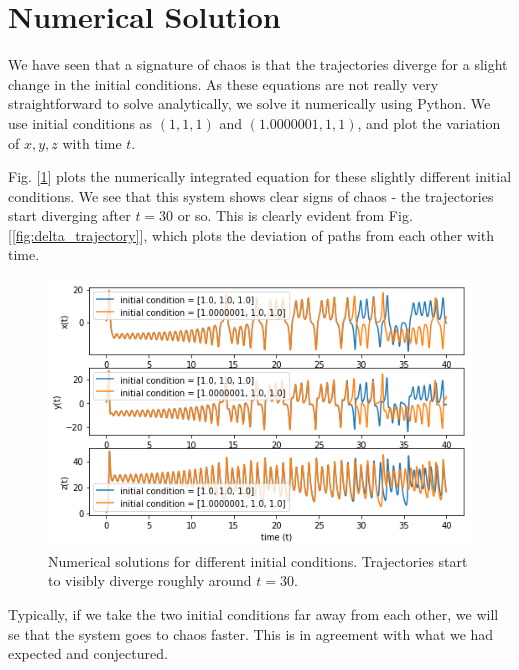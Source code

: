 \section{Numerical Solution}
We have seen that a signature of chaos is that the trajectories diverge for a slight change in the initial conditions. As these equations are not really very straightforward to solve analytically, we solve it numerically using Python. We use initial conditions as $(1,1,1)$ and $(1.0000001,1,1)$, and plot the variation of $x,y,z$ with time $t$. 

Fig. [\ref{fig:dyvar_vs_t}] plots the numerically integrated equation for these slightly different initial conditions. We see that this system shows clear signs of chaos - the trajectories start diverging after $t=30$ or so. This is clearly evident from Fig. [\ref{fig:delta_trajectory}], which plots the deviation of paths from each other with time.

\begin{figure}[h!]
	\centering
	\includegraphics[scale=0.8]{Figures/dyvar_vs_t.png}
	\caption[An Electron]{Numerical solutions for different initial conditions. Trajectories start to visibly diverge roughly around $t=30$.}
	\label{fig:dyvar_vs_t}
\end{figure}

Typically, if we take the two initial conditions far away from each other, we will se that the system goes to chaos faster. This is in agreement with what we had expected and conjectured.

